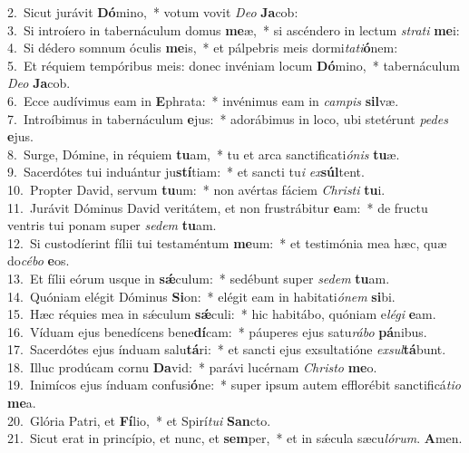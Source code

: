 {2.~}Sicut jurávit \textbf{Dó}mino,~* votum vovit \textit{De}\textit{o} \textbf{Ja}cob:\\
{3.~}Si introíero in tabernáculum domus \textbf{me}æ,~* si ascéndero in lectum \textit{stra}\textit{ti} \textbf{me}i:\\
{4.~}Si dédero somnum óculis \textbf{me}is,~* et pálpebris meis dormi\textit{ta}\textit{ti}\textbf{ó}nem:\\
{5.~}Et réquiem tempóribus meis: donec invéniam locum \textbf{Dó}mino,~* tabernáculum \textit{De}\textit{o} \textbf{Ja}cob.\\
{6.~}Ecce audívimus eam in \textbf{E}phrata:~* invénimus eam in \textit{cam}\textit{pis} \textbf{sil}væ.\\
{7.~}Introíbimus in tabernáculum \textbf{e}jus:~* adorábimus in loco, ubi stetérunt \textit{pe}\textit{des} \textbf{e}jus.\\
{8.~}Surge, Dómine, in réquiem \textbf{tu}am,~* tu et arca sanctificati\textit{ó}\textit{nis} \textbf{tu}æ.\\
{9.~}Sacerdótes tui induántur ju\textbf{stí}tiam:~* et sancti tu\textit{i} \textit{ex}\textbf{súl}tent.\\
{10.~}Propter David, servum \textbf{tu}um:~* non avértas fáciem \textit{Chri}\textit{sti} \textbf{tu}i.\\
{11.~}Jurávit Dóminus David veritátem, et non frustrábitur \textbf{e}am:~* de fructu ventris tui ponam super \textit{se}\textit{dem} \textbf{tu}am.\\
{12.~}Si custodíerint fílii tui testaméntum \textbf{me}um:~* et testimónia mea hæc, quæ do\textit{cé}\textit{bo} \textbf{e}os.\\
{13.~}Et fílii eórum usque in \textbf{sǽ}culum:~* sedébunt super \textit{se}\textit{dem} \textbf{tu}am.\\
{14.~}Quóniam elégit Dóminus \textbf{Si}on:~* elégit eam in habitati\textit{ó}\textit{nem} \textbf{si}bi.\\
{15.~}Hæc réquies mea in sǽculum \textbf{sǽ}culi:~* hic habitábo, quóniam e\textit{lé}\textit{gi} \textbf{e}am.\\
{16.~}Víduam ejus benedícens bene\textbf{dí}cam:~* páuperes ejus satu\textit{rá}\textit{bo} \textbf{pá}nibus.\\
{17.~}Sacerdótes ejus índuam salu\textbf{tá}ri:~* et sancti ejus exsultatióne \textit{ex}\textit{sul}\textbf{tá}bunt.\\
{18.~}Illuc prodúcam cornu \textbf{Da}vid:~* parávi lucérnam \textit{Chri}\textit{sto} \textbf{me}o.\\
{19.~}Inimícos ejus índuam confusi\textbf{ó}ne:~* super ipsum autem efflorébit sanctificá\textit{ti}\textit{o} \textbf{me}a.\\
{20.~}Glória Patri, et \textbf{Fí}lio,~* et Spirí\textit{tu}\textit{i} \textbf{San}cto.\\
{21.~}Sicut erat in princípio, et nunc, et \textbf{sem}per,~* et in sǽcula sæcu\textit{ló}\textit{rum}. \textbf{A}men.\\
